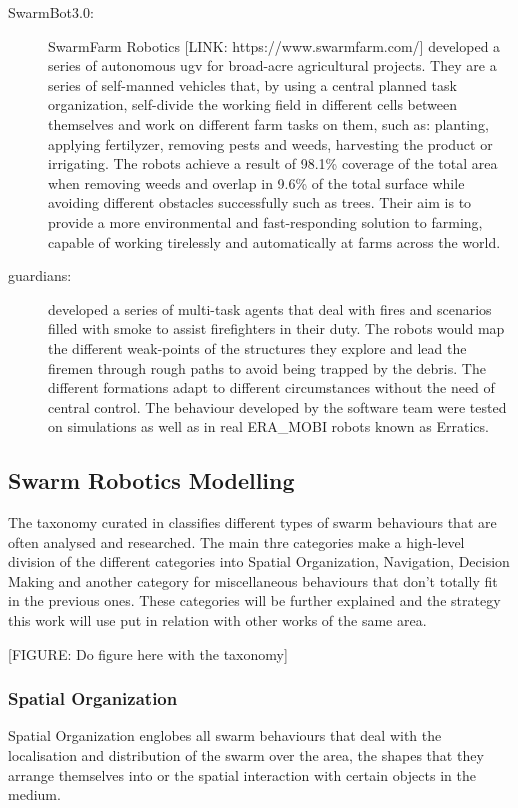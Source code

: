 \begin{description}
\item[SwarmBot3.0: ] SwarmFarm Robotics [LINK: https://www.swarmfarm.com/] \citep{F_SwarmFarm} developed a series of autonomous \gls{ugv} for broad-acre agricultural projects. They are a series of self-manned vehicles that, by using a central planned task organization, self-divide the working field in different cells between themselves and work on different farm tasks on them, such as: planting, applying fertilyzer, removing pests and weeds, harvesting the product or irrigating. The robots achieve a result of 98.1\% coverage of the total area when removing weeds and overlap in 9.6\% of the total surface while avoiding different obstacles successfully such as trees. Their aim is to provide a more environmental and fast-responding solution to farming, capable of working tirelessly and automatically at farms across the world.

\item[\gls{guardians}: ] \citet{G_Guardians} developed a series of multi-task agents that deal with fires and scenarios filled with smoke to assist firefighters in their duty. The robots would map the different weak-points of the structures they explore and lead the firemen through rough paths to avoid being trapped by the debris. The different formations adapt to different circumstances without the need of central control. The behaviour developed by the software team were tested on simulations as well as in real ERA_MOBI robots known as Erratics. 

\end{description}

\subsection{Swarm Robotics Modelling}
The taxonomy curated in \cite{D_Swarm_Applications} classifies different types of swarm behaviours that are often analysed and researched. The main thre categories make a high-level division of the different categories into Spatial Organization, Navigation, Decision Making and another category for miscellaneous behaviours that  don't totally fit in the previous ones. These categories will be further explained and the strategy this work will use put in relation with other works of the same area.

[FIGURE: Do figure here with the taxonomy]

\subsubsection{Spatial Organization}
Spatial Organization englobes all swarm behaviours that deal with the localisation and distribution of the swarm over the area, the shapes that they arrange themselves into or the spatial interaction with certain objects in the medium.

